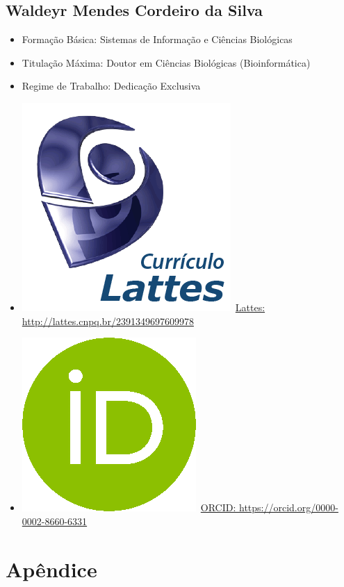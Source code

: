 \documentclass[
	10pt,				%
	openright,			%
	twoside,			%
	a4paper,			%
	english,			%
	french,				%
	brazil,				%
	sumario=tradicional
]{abntex2}
\begin{document}
\section*{Waldeyr Mendes Cordeiro da Silva}\label{WaldeyrMendes}
\begin{itemize}
	\item Formação Básica: Sistemas de Informação e Ciências Biológicas 
	\item Titulação Máxima: Doutor em Ciências Biológicas (Bioinformática)
	\item Regime de Trabalho: Dedicação Exclusiva
	\item \includegraphics[scale=.03]{fig/lattes}~\href{http://lattes.cnpq.br/2391349697609978}{Lattes: http://lattes.cnpq.br/2391349697609978}
	\item \includegraphics[scale=.15]{fig/orcid}~\href{https://orcid.org/0000-0002-8660-6331}{ORCID: https://orcid.org/0000-0002-8660-6331}
\end{itemize}


\postextual %
\chapter{Apêndice}\label{apendice}
\newpage
\end{document}
